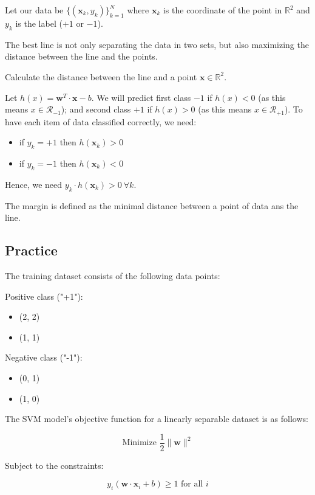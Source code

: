 \documentclass[]{article}
\newcommand{\R}{\mathbb{R}}
\begin{document}
	Let our data be $\{ (\mathbf{x}_k, y_k) \}_{k=1}^N$ where $\mathbf{x}_k$ is the coordinate of the point in $\R^2$ and $y_k$ is the label ($+1$ or $-1$).
	
	The best line is not only separating the data in two sets, but also maximizing the distance between the line and the points.
	
	Calculate the distance between the line and a point $\mathbf{x} \in \R^2$.
	
	\vspace{0.5cm}
	
	Let $h(x) = \mathbf{w}^T\cdot\mathbf{x} - b$.
	We will predict first class $-1$ if $h(x)<0$ (as this means $x \in \mathcal{R}_{-1}$); and second class $+1$ if $h(x)>0$ (as this means $x \in \mathcal{R}_{+1}$).
	To have each item of data classified correctly, we need:
	\begin{itemize}
		\item if $y_k = +1$ then $h(\mathbf{x}_k)>0$
		\item if $y_k = -1$ then $h(\mathbf{x}_k)<0$
	\end{itemize}
	Hence, we need $y_k \cdot h(\mathbf{x}_k) > 0 \ \forall k$.
	
	The margin is defined as the minimal distance between a point of data ans the line.
	
	
	
	
	\subsection{Practice}
	The training dataset consists of the following data points:
	
	Positive class ("+1"):
	\begin{itemize}
		\item (2, 2)
		\item (1, 1)
	\end{itemize}
	
	Negative class ("-1"):
	\begin{itemize}
		\item (0, 1)
		\item (1, 0)
	\end{itemize}
	
	The SVM model's objective function for a linearly separable dataset is as follows:
	
	\[
	\text{Minimize } \frac{1}{2}\|\mathbf{w}\|^2
	\]
	
	Subject to the constraints:
	
	\[
	y_i(\mathbf{w}\cdot\mathbf{x}_i + b) \geq 1 \text{ for all } i
	\]
	
\end{document}
